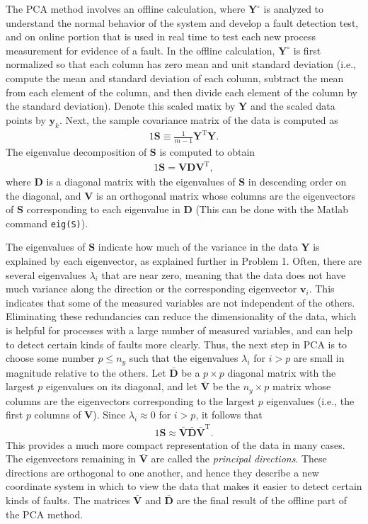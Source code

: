 \documentclass[14pt]{article}
\theoremstyle{definition}
\newcommand{\0}{\ensuremath{\mathbf{0}}}
\newcommand{\bs}[1]{\ensuremath{\mathbf{#1}}}
\begin{document}
The PCA method involves an offline calculation, where $\bs{Y}^{\circ}$ is analyzed to understand the normal behavior of the system and develop a fault detection test, and on online portion that is used in real time to test each new process measurement for evidence of a fault. In the offline calculation, $\bs{Y}^{\circ}$ is first normalized so that each column has zero mean and unit standard deviation (i.e., compute the mean and standard deviation of each column, subtract the mean from each element of the column, and then divide each element of the column by the standard deviation). Denote this scaled matix by $\bs{Y}$ and the scaled data points by $\bs{y}_k$. Next, the sample covariance matrix of the data is computed as
\begin{alignat}{1}
\bs S\equiv\frac{1}{m-1}\bs Y^\mathrm{T}\bs Y.
\end{alignat} 
The eigenvalue decomposition of $\bs{S}$ is computed to obtain
\begin{alignat}{1}
\bs S = \bs{V}\bs{D}\bs{V}^{\mathrm{T}},
\end{alignat} 
where $\bs{D}$ is a diagonal matrix with the eigenvalues of $\bs{S}$ in descending order on the diagonal, and $\bs{V}$ is an orthogonal matrix whose columns are the eigenvectors of $\bs{S}$ corresponding to each eigenvalue in $\bs{D}$ (This can be done with the Matlab command \verb+eig(S)+).

The eigenvalues of $\bs{S}$ indicate how much of the variance in the data $\bs{Y}$ is explained by each eigenvector, as explained further in Problem 1. Often, there are several eigenvalues $\lambda_i$ that are near zero, meaning that the data does not have much variance along the direction or the corresponding eigenvector $\bs{v}_i$. This indicates that some of the measured variables are not independent of the others. Eliminating these redundancies can reduce the dimensionality of the data, which is helpful for processes with a large number of measured variables, and can help to detect certain kinds of faults more clearly. Thus, the next step in PCA is to choose some number $p\leq n_y$ such that the eigenvalues $\lambda_i$ for $i>p$ are small in magnitude relative to the others. Let $\bar{\bs{D}}$ be a $p\times p$ diagonal matrix with the largest $p$ eigenvalues on its diagonal, and let $\bar{\bs{V}}$ be the $n_y\times p$ matrix whose columns are the eigenvectors corresponding to the largest $p$ eigenvalues (i.e., the first $p$ columns of $\bs{V}$). Since $\lambda_i\approx 0$ for $i>p$, it follows that
\begin{alignat}{1}
\bs S \approx \bar{\bs{V}}\bar{\bs{D}}\bar{\bs{V}}^{\mathrm{T}}.
\end{alignat}
This provides a much more compact representation of the data in many cases. The eigenvectors remaining in $\bar{\bs{V}}$ are called the \emph{principal directions}. These directions are orthogonal to one another, and hence they describe a new coordinate system in which to view the data that makes it easier to detect certain kinds of faults. The matrices $\bar{\bs{V}}$ and $\bar{\bs{D}}$ are the final result of the offline part of the PCA method.
\end{document}
